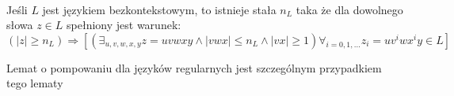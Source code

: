 	\begin{lemat}~\\
		Jeśli $L$ jest językiem bezkontekstowym, to istnieje stała $n_L$ taka że dla
		dowolnego słowa $z\in L$ spełniony jest warunek:
		\begin{equation}
			(|z| \geqslant n_L) \Rightarrow [( \exists_{u,v,w,x,y} z = uvwxy \wedge |vwx| \leqslant n_L \wedge |vx| \geqslant 1) \forall_{i=0,1,\dots} z_i = uv^iwx^iy \in L]
		\end{equation}
		\begin{uwaga}
			Lemat o pompowaniu dla języków regularnych jest szczególnym przypadkiem tego lematy
		\end{uwaga}
		

\end{lemat}
